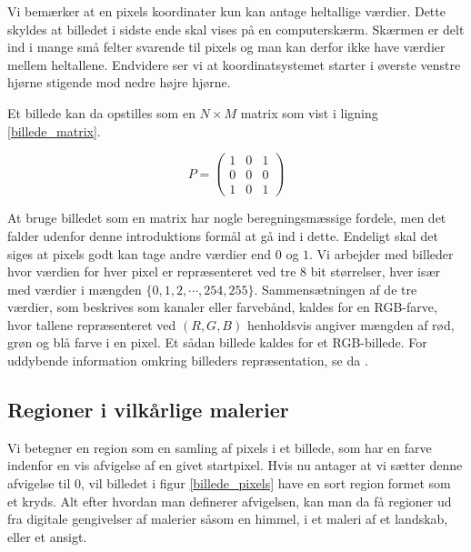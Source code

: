 {Vi bemærker at en pixels koordinater kun kan antage heltallige værdier.
Dette skyldes at billedet i sidste ende skal vises på en computerskærm.
Skærmen er delt ind i mange små felter svarende til pixels og man kan
derfor ikke have værdier mellem heltallene.  Endvidere ser vi at
koordinatsystemet starter i øverste venstre hjørne stigende mod nedre
højre hjørne.

Et billede kan da opstilles som en $N \times M$ matrix som vist i
ligning \ref{billede_matrix}.

\begin{equation}
    P = \left ( \begin{array}{ccc}
        1 & 0 & 1 \\
        0 & 0 & 0 \\
        1 & 0 & 1
    \end{array} \right )
    \label{billede_matrix}
\end{equation}

At bruge billedet som en matrix har nogle beregningsmæssige fordele, men
det falder udenfor denne introduktions formål at gå ind i dette.
Endeligt skal det siges at pixels godt kan tage andre værdier end $0$ og
$1$. Vi arbejder med billeder hvor værdien for hver pixel er
repræsenteret ved tre 8 bit størrelser, hver især med værdier i mængden
$\{0, 1, 2, \cdots, 254, 255\}$. Sammensætningen af de tre værdier, som
beskrives som kanaler eller farvebånd, kaldes for en RGB-farve, hvor
tallene repræsenteret ved $(R,G,B)$ henholdsvis angiver mængden af rød,
grøn og blå farve i en pixel. Et sådan billede kaldes for et
RGB-billede. For uddybende information omkring billeders repræsentation,
se da \cite{SIOlsen}.

\subsection{Regioner i vilkårlige malerier}
Vi betegner en region som en samling af pixels i et billede, som har en
farve indenfor en vis afvigelse af en givet startpixel. Hvis nu antager
at vi sætter denne afvigelse til $0$, vil billedet i figur
\ref{billede_pixels} have en sort region formet som et kryds. Alt efter
hvordan man definerer afvigelsen, kan man da få regioner ud fra digitale
gengivelser af malerier såsom en himmel, i et maleri af et landskab,
eller et ansigt.

}
